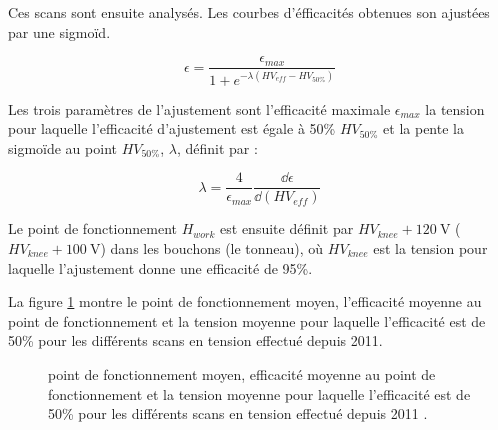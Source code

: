 Ces scans sont ensuite analysés. Les courbes d'éfficacités obtenues son ajustées par une sigmoïd.

\begin{equation}
\epsilon=\frac{\epsilon_{max}}{1+e^{-\lambda\left(HV_{eff}-HV_{50\%}\right)}}
\end{equation}

Les trois paramètres de l'ajustement sont l'efficacité maximale $\epsilon_{max}$ la tension pour laquelle l'efficacité d'ajustement est égale à \num{50}\% $HV_{50\%}$ et la pente la sigmoïde au point $HV_{50\%}$, $\lambda$, définit par :

\begin{equation}
\lambda=\frac{4}{\epsilon_{max}}\frac{\dd \epsilon}{\dd \left(HV_{eff}\right)}
\end{equation}

Le point de fonctionnement $H_{work}$ est ensuite définit par $HV_{knee}+\SI{120}{\volt}$ ($HV_{knee}+\SI{100}{\volt}$) dans les bouchons (le tonneau), où $HV_{knee}$ est la tension pour laquelle l'ajustement donne une efficacité de 95\%.

La figure \ref{working} montre le point de fonctionnement moyen, l'efficacité moyenne au point de fonctionnement et la tension moyenne pour laquelle l'efficacité est de 50\% pour les différents scans en tension effectué depuis \num{2011}.
\vspace{0.5cm}
\begin{figure}[ht!]
	\centering
	\hfill
	\caption{point de fonctionnement moyen, efficacité moyenne au point de fonctionnement et la tension moyenne pour laquelle l'efficacité est de 50\% pour les différents scans en tension effectué depuis \num{2011} \cite{working2}.}
	\label{working}
\end{figure}
\newpage
